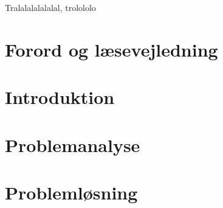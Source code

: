 



\frontmatter


\clearpage
\thispagestyle{empty} %
{\color{white}Tralalalalalalal, trolololo}
\clearpage

 \clearpage
\chapter*{Forord og læsevejledning}

\newpage

\tableofcontents* 

\mainmatter

\chapter{Introduktion}\vspace{-.75cm}


\chapter{Problemanalyse}\vspace{-.75cm}









\chapter{Problemløsning}\vspace{-.75cm}















